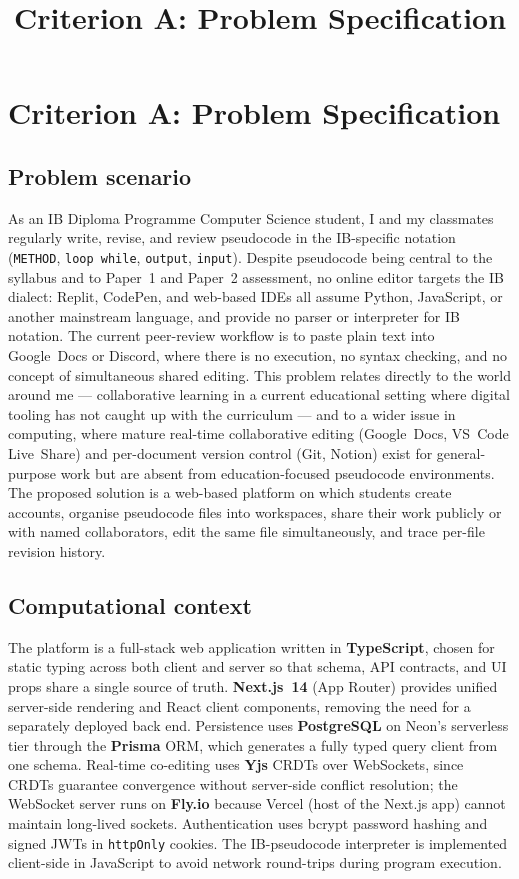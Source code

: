 \documentclass[11pt,a4paper]{article}
\title{Criterion A: Problem Specification}
\author{}
\date{}
\begin{document}
\section*{Criterion A: Problem Specification}

\subsection*{Problem scenario}

As an IB Diploma Programme Computer Science student, I and my classmates regularly write, revise, and review pseudocode in the IB-specific notation (\texttt{METHOD}, \texttt{loop while}, \texttt{output}, \texttt{input}). Despite pseudocode being central to the syllabus and to Paper~1 and Paper~2 assessment, no online editor targets the IB dialect: Replit, CodePen, and web-based IDEs all assume Python, JavaScript, or another mainstream language, and provide no parser or interpreter for IB notation. The current peer-review workflow is to paste plain text into Google~Docs or Discord, where there is no execution, no syntax checking, and no concept of simultaneous shared editing. This problem relates directly to the world around me --- collaborative learning in a current educational setting where digital tooling has not caught up with the curriculum --- and to a wider issue in computing, where mature real-time collaborative editing (Google~Docs, VS~Code Live~Share) and per-document version control (Git, Notion) exist for general-purpose work but are absent from education-focused pseudocode environments. The proposed solution is a web-based platform on which students create accounts, organise pseudocode files into workspaces, share their work publicly or with named collaborators, edit the same file simultaneously, and trace per-file revision history.

\subsection*{Computational context}

The platform is a full-stack web application written in \textbf{TypeScript}, chosen for static typing across both client and server so that schema, API contracts, and UI props share a single source of truth. \textbf{Next.js~14} (App Router) provides unified server-side rendering and React client components, removing the need for a separately deployed back end. Persistence uses \textbf{PostgreSQL} on Neon's serverless tier through the \textbf{Prisma} ORM, which generates a fully typed query client from one schema. Real-time co-editing uses \textbf{Yjs} CRDTs over WebSockets, since CRDTs guarantee convergence without server-side conflict resolution; the WebSocket server runs on \textbf{Fly.io} because Vercel (host of the Next.js app) cannot maintain long-lived sockets. Authentication uses bcrypt password hashing and signed JWTs in \texttt{httpOnly} cookies. The IB-pseudocode interpreter is implemented client-side in JavaScript to avoid network round-trips during program execution.
\end{document}
